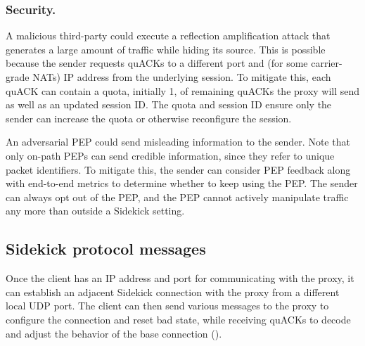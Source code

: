 \subsubsection{Security.}
A malicious third-party could execute a reflection amplification attack that
generates a large amount of traffic while hiding its source. This is
possible because the sender requests quACKs to a different port and (for some
carrier-grade NATs) IP address from the underlying session. To mitigate this,
each quACK can contain a quota, initially 1, of remaining quACKs the proxy
will send as well as an updated session ID\@.
The quota and session ID ensure only the sender can increase the quota or
otherwise reconfigure the session.

An adversarial PEP could send misleading information to the sender. Note that
only on-path PEPs can send credible information, since they refer to unique
packet identifiers.
To mitigate this, the sender can consider PEP feedback along with
end-to-end metrics to determine whether to keep using the PEP. The sender can
always opt out of the PEP, and the PEP cannot actively manipulate traffic any
more than outside a Sidekick setting.




\subsection{Sidekick protocol messages}



Once the client has an IP address and port for communicating with the proxy, it
can establish an adjacent Sidekick connection with the proxy from a different
local UDP port. The client can then send various messages to the proxy to
configure the connection and reset bad state, while receiving quACKs to decode
and adjust the behavior of the base connection ().

